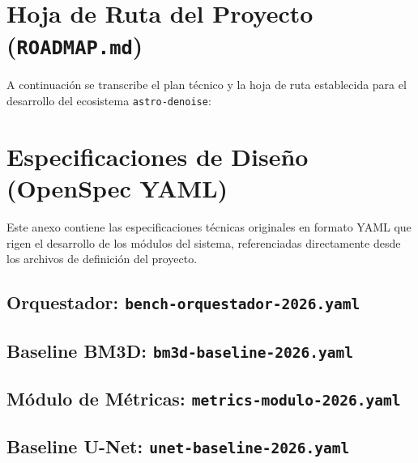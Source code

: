 \chapter{Hoja de Ruta del Proyecto (\texttt{ROADMAP.md})}

A continuaci\'on se transcribe el plan t\'ecnico y la hoja de ruta establecida para el desarrollo del ecosistema \texttt{astro-denoise}:



\newpage

\chapter{Especificaciones de Diseño (OpenSpec YAML)}

Este anexo contiene las especificaciones t\'ecnicas originales en formato YAML que rigen el desarrollo de los módulos del sistema, referenciadas directamente desde los archivos de definición del proyecto.

\section{Orquestador: \texttt{bench-orquestador-2026.yaml}}


\section{Baseline BM3D: \texttt{bm3d-baseline-2026.yaml}}


\section{Módulo de Métricas: \texttt{metrics-modulo-2026.yaml}}


\section{Baseline U-Net: \texttt{unet-baseline-2026.yaml}}

